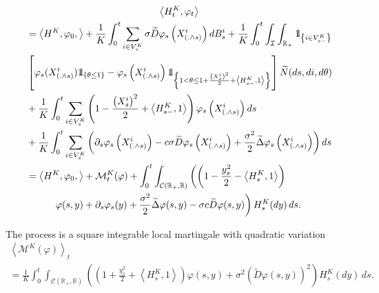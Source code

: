 \documentclass[AHL,Unicode,longabstracts,published]{cedram}
\newcommand{\Co}{\mathcal{C}}
\newcommand{\Io}{\mathcal{I}}
\newcommand{\Mo}{\mathcal{M}}
\newcommand*\R{\mathbb{R}}
\newcommand*\ind{{\mathchoice {\rm 1\mskip-4mu l} {\rm 1\mskip-4mu l} {\rm 1\mskip-4.5mu l} {\rm 1\mskip-5mu l}}}
\let\oldtilde\tilde
\renewcommand*{\tilde}[1]{\mathchoice{\widetilde{#1}}{\widetilde{#1}}{\oldtilde{#1}}{\oldtilde{#1}}}
\begin{document}
\begingroup
\allowdisplaybreaks
\begin{multline}\label{eq:sde2}
\left\langle H^{K}_t,\varphi_t\right\rangle
\\
\begin{aligned}
& = \left\langle H^{K}, \varphi_0,\right\rangle+ \frac{1}{K} \int_0^t \sum_{i \in  V^K_{s}} \sigma {\widetilde{D}} \varphi_s\left(X^i_{(.\wedge s)}\right) dB^i_s
  +\frac{1}{K}\int_0^t \int_{\Io}\int_{\R_+}\ind_{\left\{i \in V^K_{s-}\right\}}\\
& \left[\varphi_{s}(X^i_{\left(.\wedge s\right)})\ind_{\left\{\theta \leq 1\right\}} -\varphi_{s}\left(X^i_{\left(.\wedge s\right)}\right) \ind_{\left\{1 < \theta \leq 1+\frac{\left(X^i_s\right)^2}{2}+\left\langle H_{s-}^{K}, 1\right\rangle\right\}} \right] \tilde N(ds, di, d\theta) \\*
&+\frac{1}{K}\int_0^t \sum_{i \in V^K_{s}} \left(1 - \frac{\left(X^i_s\right)^2}{2}+\left\langle H_{s-}^{K},1\right\rangle \right) \varphi_{s}\left(X^i_{\left(.\wedge s\right)}\right) ds\\
&+\frac{1}{K} \int_0^t \sum_{i \in V^K_s}\left(\partial_s \varphi_s\left(X^i_{\left(.\wedge s\right)}\right) -c\sigma {\widetilde{D}}\varphi_s\left(X^i_{\left(.\wedge s\right)}\right)+\frac{\sigma^2}{2} {\widetilde{\Delta}}\varphi_s\left(X^i_{\left(.\wedge s\right)}\right) \right) ds\\
&= \left\langle H^{K}, \varphi_0,\right\rangle+ \Mo^K_t(\varphi)+
\int_0^t \int_{\Co\left(\R_+, \R\right)} \left(\left(1- \frac{y_s^2}{2} - \left\langle H^K_s,1\right\rangle\right)\right.
\\
& \mkern50mu\left.
\varphi(s,y) + \partial_s \varphi_s(y) +
\frac{\sigma^2}{2} \widetilde{\Delta}\varphi(s,y)-\sigma c \widetilde{D}\varphi(s,y) \right)H^K_s(dy)\, ds.
\end{aligned}
\end{multline}
\endgroup

The process is a square integrable local martingale with quadratic variation
\begin{multline}\label{eq:mart}
\left\langle \Mo^K(\varphi) \right\rangle_{t} \\= \frac{1}{K} \int_0^t \int_{\Co\left(\R_+,\R\right)} \left(\left(1+ \frac{y_s^2}{2} + \left\langle H^K_s,1\right\rangle\right)\varphi(s,y) + \sigma^2 \left({\widetilde{D}}\varphi(s,y)\right)^2
\right)H^K_s(dy)\, ds.
\end{multline}
\end{document}

